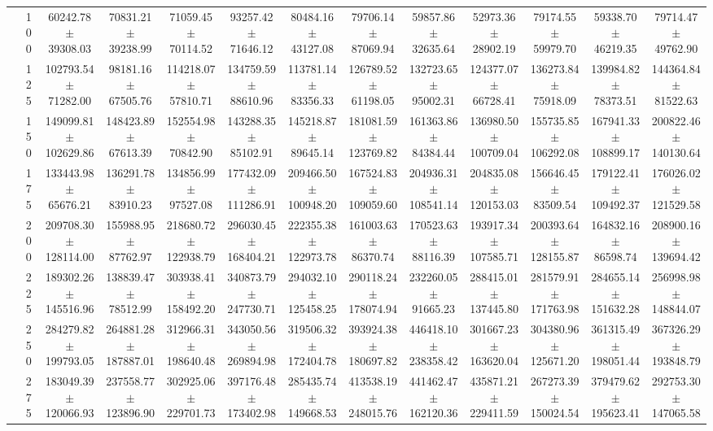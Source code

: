 \begin{table}[h]
{\begin{tabular}{
        ccccccccccccc}
 & 100& 60242.78 $\pm$ 39308.03& 70831.21 $\pm$ 39238.99& 71059.45 $\pm$ 70114.52& 93257.42 $\pm$ 71646.12& 80484.16 $\pm$ 43127.08& 79706.14 $\pm$ 87069.94& 59857.86 $\pm$ 32635.64& 52973.36 $\pm$ 28902.19& 79174.55 $\pm$ 59979.70& 59338.70 $\pm$ 46219.35& 79714.47 $\pm$ 49762.90 \\ 
 & 125& 102793.54 $\pm$ 71282.00& 98181.16 $\pm$ 67505.76& 114218.07 $\pm$ 57810.71& 134759.59 $\pm$ 88610.96& 113781.14 $\pm$ 83356.33& 126789.52 $\pm$ 61198.05& 132723.65 $\pm$ 95002.31& 124377.07 $\pm$ 66728.41& 136273.84 $\pm$ 75918.09& 139984.82 $\pm$ 78373.51& 144364.84 $\pm$ 81522.63 \\ 
 & 150& 149099.81 $\pm$ 102629.86& 148423.89 $\pm$ 67613.39& 152554.98 $\pm$ 70842.90& 143288.35 $\pm$ 85102.91& 145218.87 $\pm$ 89645.14& 181081.59 $\pm$ 123769.82& 161363.86 $\pm$ 84384.44& 136980.50 $\pm$ 100709.04& 155735.85 $\pm$ 106292.08& 167941.33 $\pm$ 108899.17& 200822.46 $\pm$ 140130.64 \\ 
 & 175& 133443.98 $\pm$ 65676.21& 136291.78 $\pm$ 83910.23& 134856.99 $\pm$ 97527.08& 177432.09 $\pm$ 111286.91& 209466.50 $\pm$ 100948.20& 167524.83 $\pm$ 109059.60& 204936.31 $\pm$ 108541.14& 204835.08 $\pm$ 120153.03& 156646.45 $\pm$ 83509.54& 179122.41 $\pm$ 109492.37& 176026.02 $\pm$ 121529.58 \\ 
 & 200& 209708.30 $\pm$ 128114.00& 155988.95 $\pm$ 87762.97& 218680.72 $\pm$ 122938.79& 296030.45 $\pm$ 168404.21& 222355.38 $\pm$ 122973.78& 161003.63 $\pm$ 86370.74& 170523.63 $\pm$ 88116.39& 193917.34 $\pm$ 107585.71& 200393.64 $\pm$ 128155.87& 164832.16 $\pm$ 86598.74& 208900.16 $\pm$ 139694.42 \\ 
 & 225& 189302.26 $\pm$ 145516.96& 138839.47 $\pm$ 78512.99& 303938.41 $\pm$ 158492.20& 340873.79 $\pm$ 247730.71& 294032.10 $\pm$ 125458.25& 290118.24 $\pm$ 178074.94& 232260.05 $\pm$ 91665.23& 288415.01 $\pm$ 137445.80& 281579.91 $\pm$ 171763.98& 284655.14 $\pm$ 151632.28& 256998.98 $\pm$ 148844.07 \\ 
 & 250& 284279.82 $\pm$ 199793.05& 264881.28 $\pm$ 187887.01& 312966.31 $\pm$ 198640.48& 343050.56 $\pm$ 269894.98& 319506.32 $\pm$ 172404.78& 393924.38 $\pm$ 180697.82& 446418.10 $\pm$ 238358.42& 301667.23 $\pm$ 163620.04& 304380.96 $\pm$ 125671.20& 361315.49 $\pm$ 198051.44& 367326.29 $\pm$ 193848.79 \\ 
 & 275& 183049.39 $\pm$ 120066.93& 237558.77 $\pm$ 123896.90& 302925.06 $\pm$ 229701.73& 397176.48 $\pm$ 173402.98& 285435.74 $\pm$ 149668.53& 413538.19 $\pm$ 248015.76& 441462.47 $\pm$ 162120.36& 435871.21 $\pm$ 229411.59& 267273.39 $\pm$ 150024.54& 379479.62 $\pm$ 195623.41& 292753.30 $\pm$ 147065.58 \\ 

\end{tabular}}
\end{table}
